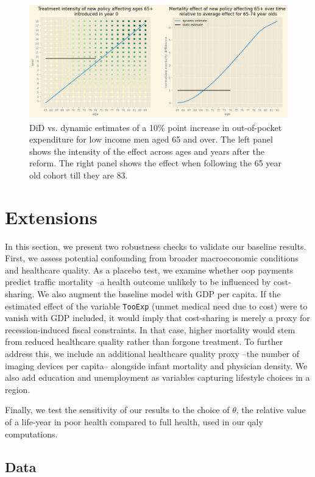 \documentclass[a4paper,12pt]{article}
\begin{document}
\begin{figure}[htbp]
\centering
\includegraphics[height=5cm]{./figures/years_treatment.png}
\caption{\label{fig:years_treatment}DiD vs. dynamic estimates of a 10\% point increase in out-of-pocket expenditure for low income men aged 65 and over. The left panel shows the intensity of the effect across ages and years after the reform. The right panel shows the effect when following the 65 year old cohort till they are 83.}
\end{figure}
\section{Extensions}
\label{sec:orge5ef6ac}

In this section, we present two robustness checks to validate our baseline results. First, we assess potential confounding from broader macroeconomic conditions and healthcare quality. As a placebo test, we examine whether oop payments predict traffic mortality --a health outcome unlikely to be influenced by cost-sharing. We also augment the baseline model with GDP per capita. If the estimated effect of the variable \texttt{TooExp} (unmet medical need due to cost) were to vanish with GDP included, it would imply that cost-sharing is merely a proxy for recession-induced fiscal constraints. In that case, higher mortality would stem from reduced healthcare quality rather than forgone treatment. To further address this, we include an additional healthcare quality proxy --the number of imaging devices per capita-- alongside infant mortality and physician density. We also add education and unemployment as variables capturing lifestyle choices in a region.

Finally, we test the sensitivity of our results to the choice of \(\theta\), the relative value of a life-year in poor health compared to full health, used in our qaly computations.
\subsection{Data}
\label{sec:orgb3a471f}
\end{document}
